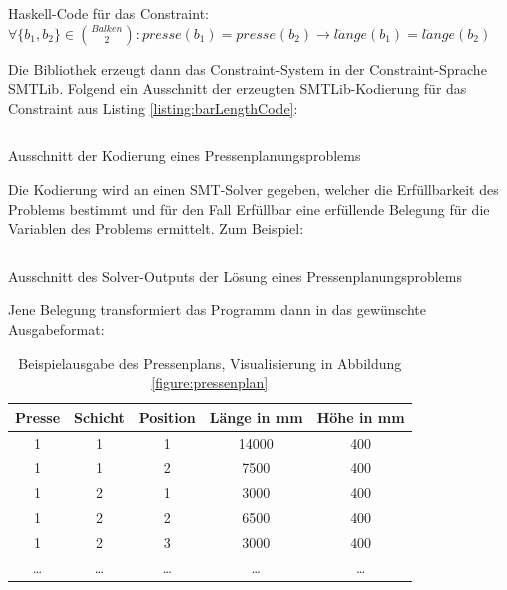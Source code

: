 \begin{listing}[H]
    \inputminted[linenos=true]{haskell}{Code/Einleitung/PressenlängeConstraintHaskell.hs}
    \caption{Haskell-Code für das Constraint: $ \forall \{b_1, b_2\} \in \binom{Balken}{2}: presse(b_1) = presse(b_2) \rightarrow l\ddot ange(b_1) = l\ddot ange(b_2) $}
    \label{listing:barLengthCode}
\end{listing}

Die Bibliothek erzeugt dann das Constraint-System in der Constraint-Sprache SMTLib.
Folgend ein Ausschnitt der erzeugten SMTLib-Kodierung für das Constraint aus Listing \ref{listing:barLengthCode}:

\begin{listing}[H]
    \inputminted[linenos=true]{bash}{Code/Einleitung/PressenlängeConstraintSMTLib.smt2}
    \caption{Ausschnitt der Kodierung eines Pressenplanungsproblems}
    \label{listing:barLengthSMTlib}
\end{listing}

Die Kodierung wird an einen SMT-Solver gegeben, welcher die Erfüllbarkeit des Problems bestimmt und für den Fall Erfüllbar eine erfüllende Belegung für die Variablen des Problems ermittelt.
Zum Beispiel:

\begin{listing}[H]
    \inputminted[linenos=true]{bash}{Code/Einleitung/PressenlängeConstraintSolverOutput.smt2}
    \caption{Ausschnitt des Solver-Outputs der Lösung eines Pressenplanungsproblems}
    \label{listing:barLengthSolverOutput}
\end{listing}

Jene Belegung transformiert das Programm dann in das gewünschte Ausgabeformat:

\begin{table}[H]
    \centering
    \begin{tabular}{|c|c|c|c|c|}
        \hline
        \textbf{Presse} & \textbf{Schicht} & \textbf{Position} & \textbf{Länge in mm} & \textbf{Höhe in mm} \\
        \hline
        1 & 1 & 1 & 14000 & 400 \\
        1 & 1 & 2 & 7500 & 400 \\
        1 & 2 & 1 & 3000 & 400 \\
        1 & 2 & 2 & 6500 & 400 \\
        1 & 2 & 3 & 3000 & 400 \\
        \ldots & \ldots & \ldots & \ldots & \ldots \\
        \hline
    \end{tabular}
    \caption{Beispielausgabe des Pressenplans, Visualisierung in Abbildung \ref{figure:pressenplan}}
    \label{table:pressenplan}
\end{table}

